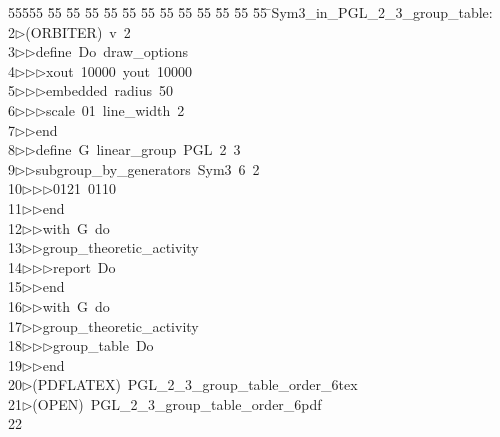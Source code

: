 %
%
\begin{tabbing}
55555 \= 55 \= 55 \= 55 \= 55 \= 55 \= 55 \= 55 \= 55 \= 55 \= 55 \= 55 \= 55 \= \>Sym3\_in\_PGL\_2\_3\_group\_table:\\[0pt]
2\>$\triangleright$\>(ORBITER)\ v\ 2\ \\[0pt]
3\>$\triangleright$\>$\triangleright$\>define\ Do\ draw\_options\ \\[0pt]
4\>$\triangleright$\>$\triangleright$\>$\triangleright$\>xout\ 10000\ yout\ 10000\ \\[0pt]
5\>$\triangleright$\>$\triangleright$\>$\triangleright$\>embedded\ radius\ 50\ \\[0pt]
6\>$\triangleright$\>$\triangleright$\>$\triangleright$\>scale\ 01\ line\_width\ 2\ \\[0pt]
7\>$\triangleright$\>$\triangleright$\>end\ \\[0pt]
8\>$\triangleright$\>$\triangleright$\>define\ G\ linear\_group\ PGL\ 2\ 3\ \\[0pt]
9\>$\triangleright$\>$\triangleright$\>subgroup\_by\_generators\ Sym3\ 6\ 2\ \\[0pt]
10\>$\triangleright$\>$\triangleright$\>$\triangleright$\>0121\ 0110\ \\[0pt]
11\>$\triangleright$\>$\triangleright$\>end\ \\[0pt]
12\>$\triangleright$\>$\triangleright$\>with\ G\ do\ \\[0pt]
13\>$\triangleright$\>$\triangleright$\>group\_theoretic\_activity\ \\[0pt]
14\>$\triangleright$\>$\triangleright$\>$\triangleright$\>report\ Do\ \\[0pt]
15\>$\triangleright$\>$\triangleright$\>end\ \\[0pt]
16\>$\triangleright$\>$\triangleright$\>with\ G\ do\ \\[0pt]
17\>$\triangleright$\>$\triangleright$\>group\_theoretic\_activity\ \\[0pt]
18\>$\triangleright$\>$\triangleright$\>$\triangleright$\>group\_table\ Do\ \\[0pt]
19\>$\triangleright$\>$\triangleright$\>end\\[0pt]
20\>$\triangleright$\>(PDFLATEX)\ PGL\_2\_3\_group\_table\_order\_6tex\\[0pt]
21\>$\triangleright$\>(OPEN)\ PGL\_2\_3\_group\_table\_order\_6pdf\\[0pt]
22\>\end{tabbing}
